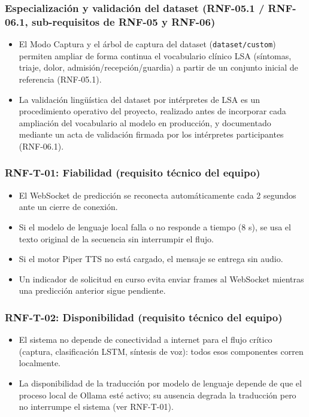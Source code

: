 \subsubsection{Especialización y validación del dataset (RNF-05.1 / RNF-06.1, sub-requisitos de RNF-05 y RNF-06)}
\begin{itemize}
    \item El Modo Captura y el árbol de captura del dataset (\texttt{dataset/custom}) permiten ampliar de forma continua el vocabulario clínico LSA (síntomas, triaje, dolor, admisión/recepción/guardia) a partir de un conjunto inicial de referencia (RNF-05.1).
    \item La validación lingüística del dataset por intérpretes de LSA es un procedimiento operativo del proyecto, realizado antes de incorporar cada ampliación del vocabulario al modelo en producción, y documentado mediante un acta de validación firmada por los intérpretes participantes (RNF-06.1).
\end{itemize}

\subsubsection{RNF-T-01: Fiabilidad (requisito técnico del equipo)}
\begin{itemize}
    \item El WebSocket de predicción se reconecta automáticamente cada 2 segundos ante un cierre de conexión.
    \item Si el modelo de lenguaje local falla o no responde a tiempo (8 s), se usa el texto original de la secuencia sin interrumpir el flujo.
    \item Si el motor Piper TTS no está cargado, el mensaje se entrega sin audio.
    \item Un indicador de solicitud en curso evita enviar frames al WebSocket mientras una predicción anterior sigue pendiente.
\end{itemize}

\subsubsection{RNF-T-02: Disponibilidad (requisito técnico del equipo)}
\begin{itemize}
    \item El sistema no depende de conectividad a internet para el flujo crítico (captura, clasificación LSTM, síntesis de voz): todos esos componentes corren localmente.
    \item La disponibilidad de la traducción por modelo de lenguaje depende de que el proceso local de Ollama esté activo; su ausencia degrada la traducción pero no interrumpe el sistema (ver RNF-T-01).
\end{itemize}

